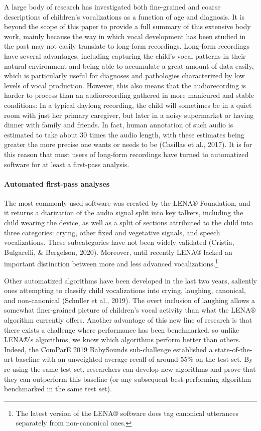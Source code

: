 \documentclass[
  english,
  ,man]{apa6}
\let\oldparagraph\paragraph
\renewcommand{\paragraph}[1]{\oldparagraph{#1}\mbox{}}
\begin{document}
A large body of research has investigated both fine-grained and coarse descriptions of children's vocalizations as a function of age and diagnosis. It is beyond the scope of this paper to provide a full summary of this extensive body work, mainly because the way in which vocal development has been studied in the past may not easily translate to long-form recordings. Long-form recordings have several advantages, including capturing the child's vocal patterns in their natural environment and being able to accumulate a great amount of data easily, which is particularly useful for diagnoses and pathologies characterized by low levels of vocal production. However, this also means that the audiorecording is harder to process than an audiorecording gathered in more manicured and stable conditions: In a typical daylong recording, the child will sometimes be in a quiet room with just her primary caregiver, but later in a noisy supermarket or having dinner with family and friends. In fact, human annotation of such audio is estimated to take about 30 times the audio length, with these estimates being greater the more precise one wants or needs to be (Casillas et al., 2017). It is for this reason that most users of long-form recordings have turned to automatized software for at least a first-pass analysis.

\hypertarget{automated-first-pass-analyses}{%
\paragraph{Automated first-pass analyses}\label{automated-first-pass-analyses}}

The most commonly used software was created by the LENA® Foundation, and it returns a diarization of the audio signal split into key talkers, including the child wearing the device, as well as a split of sections attributed to the child into three categories: crying, other fixed and vegetative signals, and speech vocalizations. These subcategories have not been widely validated (Cristia, Bulgarelli, \& Bergelson, 2020). Moreover, until recently LENA® lacked an important distinction between more and less advanced vocalizations.\footnote{The latest version of the LENA® software does tag canonical utterances separately from non-canonical ones.}

Other automatized algorithms have been developed in the last two years, saliently ones attempting to classify child vocalizations into crying, laughing, canonical, and non-canonical (Schuller et al., 2019). The overt inclusion of laughing allows a somewhat finer-grained picture of children's vocal activity than what the LENA® algorithm currently offers. Another advantage of this new line of research is that there exists a challenge where performance has been benchmarked, so unlike LENA®'s algorithms, we know which algorithms perform better than others. Indeed, the ComParE 2019 BabySounds sub-challenge established a state-of-the-art baseline with an unweighted average recall of around 55\% on the test set. By re-using the same test set, researchers can develop new algorithms and prove that they can outperform this baseline (or any subsequent best-performing algorithm benchmarked in the same test set).
\end{document}
